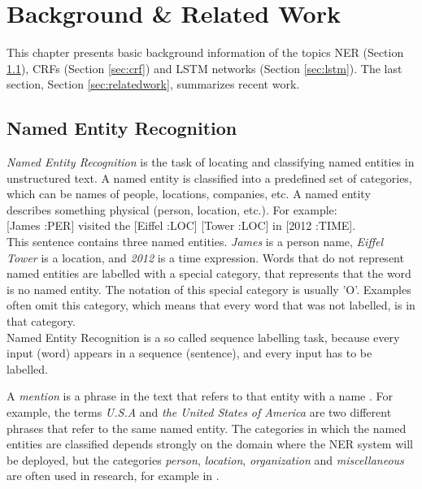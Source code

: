 \documentclass[12pt]{book}
\begin{document}
	\chapter{Background \& Related Work}
	\label{chap:backround}
	
	This chapter presents basic background information of the topics NER (Section \ref{sec:ner}), CRFs (Section \ref{sec:crf}) and LSTM networks (Section \ref{sec:lstm}). The last section, Section \ref{sec:relatedwork}, summarizes recent work.

	
	\section{Named Entity Recognition}
	\label{sec:ner}
	
	\textit{Named Entity Recognition} is the task of locating and classifying named entities in unstructured text. A named entity is classified into a predefined set of categories, which can be names of people, locations, companies, etc. A named entity describes something physical (person, location, etc.). For example: \\
	
	[James :PER] visited the [Eiffel :LOC] [Tower :LOC] in [2012 :TIME]. \\
	
	This sentence contains three named entities. \textit{James} is a person name, \textit{Eiffel Tower} is a location, and \textit{2012} is a time expression. Words that do not represent named entities are labelled with a special category, that represents that the word is no named entity. The notation of this special category is usually 'O'. Examples often omit this category, which means that every word that was not labelled, is in that category. \\

	
	Named Entity Recognition is a so called sequence labelling task, because every input (word) appears in a sequence (sentence), and every input has to be labelled.
	 
	A \textit{mention} is a phrase in the text that refers to that entity with a name \cite{MAL-013}. For example, the terms \textit{U.S.A} and \textit{the United States of America} are two different phrases that refer to the same named entity.
	The categories in which the named entities are classified depends strongly on the domain where the NER system will be deployed, but the categories \textit{person}, \textit{location}, \textit{organization} and \textit{miscellaneous} are often used in research, for example in \cite{tjongkimsang2003conll}.
\end{document}
